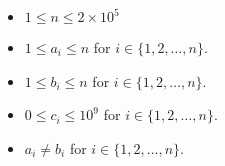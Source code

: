 \begin{itemize}
\tightlist
\item $1 \le n \le 2\times 10^5$
\item $1\le a_i\le n$ for $i\in \{1,2,\dots,n\}$.
\item $1\le b_i\le n$ for $i\in \{1,2,\dots,n\}$.
\item $0\le c_i\le 10^9$ for $i\in \{1,2,\dots,n\}$.
\item $a_i\neq b_i$ for $i\in \{1,2,\dots,n\}$.
\end{itemize}
